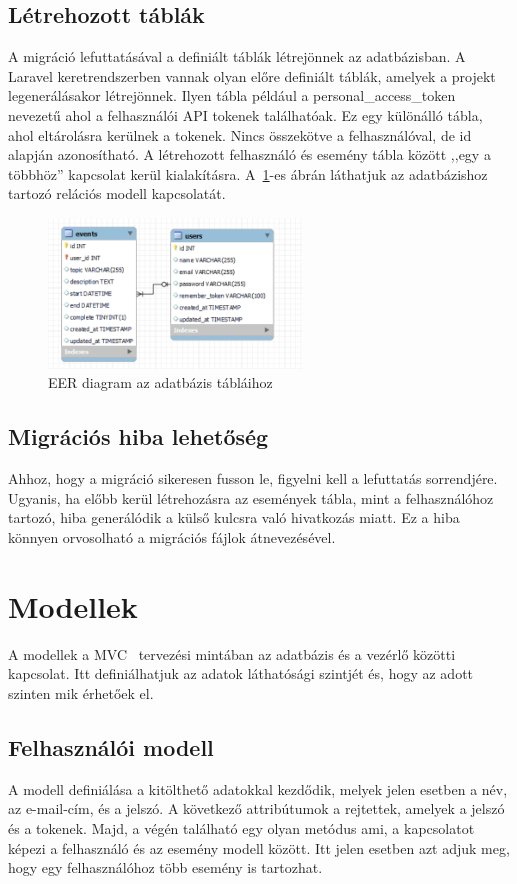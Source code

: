 \documentclass[
]{thesis-ekf}
\theoremstyle{definition}
\theoremstyle{remark}
\begin{document}
	\subsection{Létrehozott táblák}
	A migráció lefuttatásával a definiált táblák létrejönnek az adatbázisban. A Laravel keretrendszerben vannak olyan előre definiált táblák, amelyek a projekt legenerálásakor létrejönnek. Ilyen tábla például a personal\_access\_token nevezetű ahol a felhasználói API tokenek találhatóak. Ez egy különálló tábla, ahol eltárolásra kerülnek a tokenek. Nincs összekötve a felhasználóval, de id alapján azonosítható. A létrehozott felhasználó és esemény tábla között ,,egy a többhöz'' kapcsolat kerül kialakításra. A~\ref{figure:eer_diagram}-es ábrán láthatjuk az adatbázishoz tartozó relációs modell kapcsolatát.
	
	\begin{figure}[ht!]
		\centering
		\includegraphics[width=0.6\textwidth]{database/EER_diagram}
		\caption{EER diagram az adatbázis tábláihoz}
		\label{figure:eer_diagram}
	\end{figure}
	
	\subsection{Migrációs hiba lehetőség}
	Ahhoz, hogy a migráció sikeresen fusson le, figyelni kell a lefuttatás sorrendjére. Ugyanis, ha előbb kerül létrehozásra az események tábla, mint a felhasználóhoz tartozó, hiba generálódik a külső kulcsra való hivatkozás miatt. Ez a hiba könnyen orvosolható a migrációs fájlok átnevezésével.
	
	\section{Modellek}
	A modellek a MVC~\cite{mvc_mozzilla} tervezési mintában az adatbázis és a vezérlő közötti kapcsolat. Itt definiálhatjuk az adatok láthatósági szintjét és, hogy az adott szinten mik érhetőek el.
	
	\subsection{Felhasználói modell}
	A modell definiálása a kitölthető adatokkal kezdődik, melyek jelen esetben a név, az e-mail-cím, és a jelszó. A következő attribútumok a rejtettek, amelyek a jelszó és a tokenek. Majd, a végén található egy olyan metódus ami, a kapcsolatot képezi a felhasználó és az esemény modell között. Itt jelen esetben azt adjuk meg, hogy egy felhasználóhoz több esemény is tartozhat.
	
\end{document}
